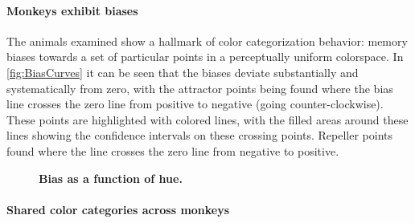 
\paragraph{Monkeys exhibit biases} %

The animals examined show a hallmark of color categorization behavior: memory biases towards a set of particular points in a perceptually uniform colorspace.
In \autoref{fig:BiasCurves} it can be seen that the biases deviate substantially and systematically from zero, with the attractor points being found where the bias line crosses the zero line from positive to negative (going counter-clockwise). These points are highlighted with colored lines, with the filled areas around these lines showing the confidence intervals on these crossing points. Repeller points found where the line crosses the zero line from negative to positive.

\begin{figure}

\caption{\textbf{Bias as a function of hue.} 
}
\label{fig:BiasCurves}
\end{figure}

\paragraph{Shared color categories across monkeys}


